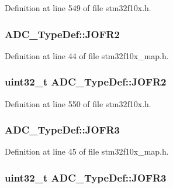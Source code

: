 Definition at line 549 of file stm32f10x.\+h.

\subsubsection[{\texorpdfstring{J\+O\+F\+R2}{JOFR2}}]{ A\+D\+C\+\_\+\+Type\+Def\+::\+J\+O\+F\+R2}\hypertarget{struct_a_d_c___type_def_ae0fe51e21716103577ed2611ea83f956}{}\label{struct_a_d_c___type_def_ae0fe51e21716103577ed2611ea83f956}


Definition at line 44 of file stm32f10x\+\_\+map.\+h.

\subsubsection[{\texorpdfstring{J\+O\+F\+R2}{JOFR2}}]{ {\bf uint32\+\_\+t} A\+D\+C\+\_\+\+Type\+Def\+::\+J\+O\+F\+R2}\hypertarget{struct_a_d_c___type_def_aa20f76044c11042dde41c1060853fb82}{}\label{struct_a_d_c___type_def_aa20f76044c11042dde41c1060853fb82}


Definition at line 550 of file stm32f10x.\+h.

\subsubsection[{\texorpdfstring{J\+O\+F\+R3}{JOFR3}}]{ A\+D\+C\+\_\+\+Type\+Def\+::\+J\+O\+F\+R3}\hypertarget{struct_a_d_c___type_def_a85b3d6f855c7afe9bc73913cfc757251}{}\label{struct_a_d_c___type_def_a85b3d6f855c7afe9bc73913cfc757251}


Definition at line 45 of file stm32f10x\+\_\+map.\+h.

\subsubsection[{\texorpdfstring{J\+O\+F\+R3}{JOFR3}}]{ {\bf uint32\+\_\+t} A\+D\+C\+\_\+\+Type\+Def\+::\+J\+O\+F\+R3}\hypertarget{struct_a_d_c___type_def_ae9c78142f6edf8122384263878d09015}{}\label{struct_a_d_c___type_def_ae9c78142f6edf8122384263878d09015}


